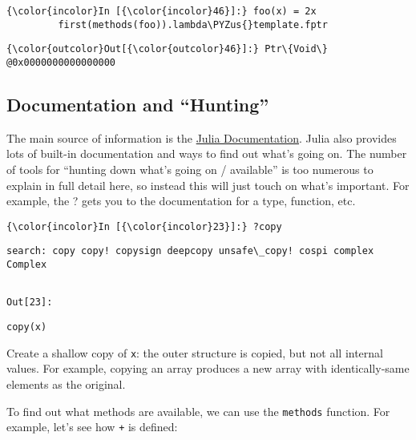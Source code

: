 \documentclass[11pt]{article}
\def\PYZus{\char`\_}
\begin{document}
    \begin{Verbatim}[commandchars=\\\{\}]
{\color{incolor}In [{\color{incolor}46}]:} foo(x) = 2x
         first(methods(foo)).lambda\PYZus{}template.fptr
\end{Verbatim}

            \begin{Verbatim}[commandchars=\\\{\}]
{\color{outcolor}Out[{\color{outcolor}46}]:} Ptr\{Void\} @0x0000000000000000
\end{Verbatim}
        
    \subsection{Documentation and
``Hunting''}\label{documentation-and-hunting}

The main source of information is the
\href{http://docs.julialang.org/en/latest/manual/}{Julia Documentation}.
Julia also provides lots of built-in documentation and ways to find out
what's going on. The number of tools for ``hunting down what's going on
/ available'' is too numerous to explain in full detail here, so instead
this will just touch on what's important. For example, the ? gets you to
the documentation for a type, function, etc.

    \begin{Verbatim}[commandchars=\\\{\}]
{\color{incolor}In [{\color{incolor}23}]:} ?copy
\end{Verbatim}

    \begin{Verbatim}[commandchars=\\\{\}]
search: copy copy! copysign deepcopy unsafe\_copy! cospi complex Complex


    \end{Verbatim}
\texttt{\color{outcolor}Out[{\color{outcolor}23}]:}
    
    \begin{verbatim}
copy(x)
\end{verbatim}

Create a shallow copy of \texttt{x}: the outer structure is copied, but
not all internal values. For example, copying an array produces a new
array with identically-same elements as the original.

    

    To find out what methods are available, we can use the \texttt{methods}
function. For example, let's see how \texttt{+} is defined:
\end{document}
